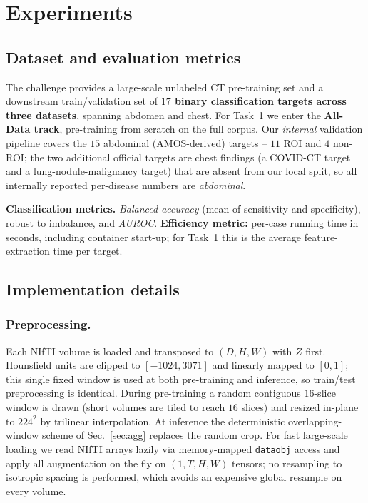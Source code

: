 \documentclass[runningheads]{llncs}
\begin{document}
\section{Experiments}

\subsection{Dataset and evaluation metrics}
The challenge provides a large-scale unlabeled CT pre-training set and a
downstream train/validation set of \textbf{$17$ binary classification targets
across three datasets}, spanning abdomen and chest. For Task~1 we enter the
\textbf{All-Data track}, pre-training from scratch on the full corpus. Our
\emph{internal} validation pipeline covers the $15$ abdominal (AMOS-derived)
targets -- $11$ ROI and $4$ non-ROI; the two additional official targets are
chest findings (a COVID-CT target and a lung-nodule-malignancy target) that are
absent from our local split, so all internally reported per-disease numbers are
\emph{abdominal}.

\noindent\textbf{Classification metrics.}
\emph{Balanced accuracy} (mean of sensitivity and specificity), robust to
imbalance, and \emph{AUROC}. \textbf{Efficiency metric:} per-case running time
in seconds, including container start-up; for Task~1 this is the average
feature-extraction time per target.

\subsection{Implementation details}

\subsubsection{Preprocessing.}
\label{sec:preproc}
Each NIfTI volume is loaded and transposed to $(D,H,W)$ with $Z$ first. Hounsfield
units are clipped to $[-1024, 3071]$ and linearly mapped to $[0,1]$; this single
fixed window is used at both pre-training and inference, so train/test
preprocessing is identical. During pre-training a random contiguous $16$-slice
window is drawn (short volumes are tiled to reach $16$ slices) and resized
in-plane to $224^2$ by trilinear interpolation. At inference the deterministic
overlapping-window scheme of Sec.~\ref{sec:agg} replaces the random crop. For
fast large-scale loading we read NIfTI arrays lazily via memory-mapped
\texttt{dataobj} access and apply all augmentation on the fly on $(1,T,H,W)$
tensors; no resampling to isotropic spacing is performed, which avoids an
expensive global resample on every volume.
\end{document}
